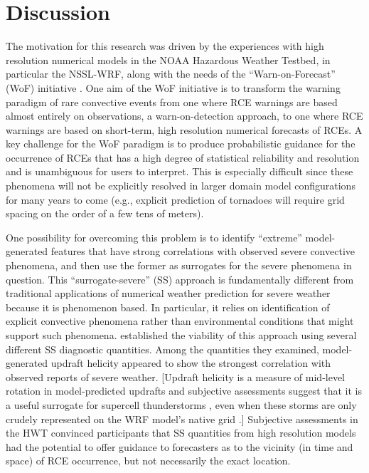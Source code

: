 

\chapter{Discussion}
\label{discussion}


The motivation for this research was driven by the experiences with high resolution numerical models in the NOAA Hazardous Weather Testbed, in particular the NSSL-WRF, along with the needs of the ``Warn-on-Forecast'' (WoF) initiative \citep{Stensrud2009}.
One aim of the WoF initiative is to transform the warning paradigm of rare convective events from one where RCE warnings are based almost entirely on observations, a warn-on-detection approach, to one where RCE warnings are based on short-term, high resolution numerical forecasts of RCEs.
A key challenge for the WoF paradigm is to produce probabilistic guidance for the occurrence of RCEs that has a high degree of statistical reliability and resolution and is unambiguous for users to interpret.
This is especially difficult since these phenomena will not be explicitly resolved in larger domain model configurations for many years to come (e.g., explicit prediction of tornadoes will require grid spacing on the order of a few tens of meters).


One possibility for overcoming this problem is to identify ``extreme'' model-generated features that have strong correlations with observed severe convective phenomena, and then use the former as surrogates for the severe phenomena in question.
This ``surrogate-severe'' (SS) approach is fundamentally different from traditional applications of numerical weather prediction for severe weather because it is phenomenon based.
In particular, it relies on identification of explicit convective phenomena rather than environmental conditions that might support such phenomena.
\cite{Sobash2011} established the viability of this approach using several different SS diagnostic quantities.
Among the quantities they examined, model-generated updraft helicity appeared to show the strongest correlation with observed reports of severe weather.
[Updraft helicity is a measure of mid-level rotation in model-predicted updrafts and subjective assessments suggest that it is a useful surrogate for supercell thunderstorms \citep{Kain2010}, even when these storms are only crudely represented on the WRF model's native grid \citep{Kain2008}.]
Subjective assessments in the HWT convinced participants that SS quantities from high resolution models had the potential to offer guidance to forecasters as to the vicinity (in time and space) of RCE occurrence, but not necessarily the exact location.


